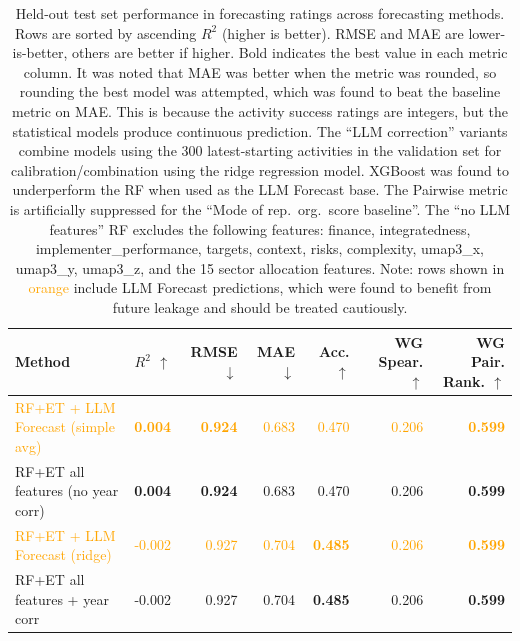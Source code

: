 \begin{table}[t]
\centering
\small
\setlength{\tabcolsep}{6pt}
\renewcommand{\arraystretch}{1.15}

\caption{Held-out test set performance in forecasting ratings across forecasting methods. Rows are sorted by ascending $R^2$ (higher is better). RMSE and MAE are lower-is-better, others are better if higher. Bold indicates the best value in each metric column. It was noted that MAE was better when the metric was rounded, so rounding the best model was attempted, which was found to beat the baseline metric on MAE. This is because the activity success ratings are integers, but the statistical models produce continuous prediction. The ``LLM correction'' variants combine models using the 300 latest-starting activities in the validation set for calibration/combination using the ridge regression model. XGBoost was found to underperform the RF when used as the LLM Forecast base. The Pairwise metric is artificially suppressed for the ``Mode of rep.\ org.\ score baseline''. The ``no LLM features'' RF excludes the following features: finance, integratedness, implementer\_performance, targets, context, risks, complexity, umap3\_x, umap3\_y, umap3\_z, and the 15 sector allocation features. Note: rows shown in \textcolor{orange}{orange} include LLM Forecast predictions, which were found to benefit from future leakage and should be treated cautiously.}
\label{tab:method_comparison_validation}
\begin{tabular}{p{3cm}rrrrrr}
\toprule
Method & $R^2$ $\uparrow$ & RMSE $\downarrow$ & MAE $\downarrow$ & Acc. $\uparrow$ & WG Spear. $\uparrow$ & WG Pair. Rank. $\uparrow$ \\
\midrule
\textcolor{orange}{RF+ET + LLM Forecast (simple avg)} & \textcolor{orange}{\textbf{0.004}} & \textcolor{orange}{\textbf{0.924}} & \textcolor{orange}{0.683} & \textcolor{orange}{0.470} & \textcolor{orange}{0.206} & \textcolor{orange}{\textbf{0.599}} \\[3pt]
RF+ET all features (no year corr) & \textbf{0.004} & \textbf{0.924} & 0.683 & 0.470 & 0.206 & \textbf{0.599} \\[3pt]
\textcolor{orange}{RF+ET + LLM Forecast (ridge)} & \textcolor{orange}{-0.002} & \textcolor{orange}{0.927} & \textcolor{orange}{0.704} & \textcolor{orange}{\textbf{0.485}} & \textcolor{orange}{0.206} & \textcolor{orange}{\textbf{0.599}} \\[3pt]
RF+ET all features + year corr & -0.002 & 0.927 & 0.704 & \textbf{0.485} & 0.206 & \textbf{0.599} \\[3pt]

\end{tabular}
\end{table}
